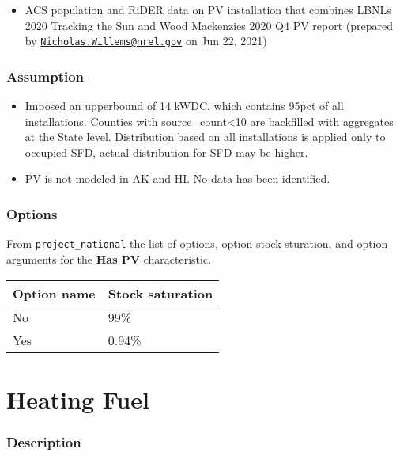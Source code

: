 \begin{itemize}
 
\item
  ACS population and RiDER data on PV installation that combines
  LBNL\textquotesingle s 2020 Tracking the Sun and Wood
  Mackenzie\textquotesingle s 2020 Q4 PV report (prepared by
  \href{mailto:Nicholas.Willems@nrel.gov}{\nolinkurl{Nicholas.Willems@nrel.gov}}
  on Jun 22, 2021)
\end{itemize}

\subsubsection{Assumption}\label{assumption-49}

\begin{itemize}
 
\item
  Imposed an upperbound of 14 kWDC, which contains 95pct of all
  installations. Counties with source\_count\textless10 are backfilled
  with aggregates at the State level. Distribution based on all
  installations is applied only to occupied SFD, actual distribution for
  SFD may be higher.
\item
  PV is not modeled in AK and HI. No data has been identified.
\end{itemize}

\subsubsection{Options}\label{options-85}

From \texttt{project\_national} the list of options, option stock
sturation, and option arguments for the \textbf{Has PV} characteristic.

\begin{longtable}[]{@{}ll@{}}
\toprule\noalign{}
Option name & Stock saturation \\
\midrule\noalign{}
\endhead
\bottomrule\noalign{}
\endlastfoot
No & 99\% \\
Yes & 0.94\% \\
\end{longtable}

\section{Heating Fuel}\label{heating_fuel}

\subsubsection{Description}\label{description-86}

